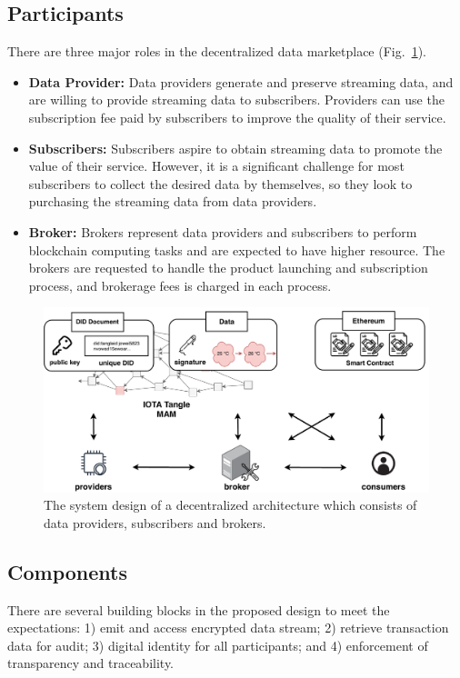 \documentclass[conference]{IEEEtran}
\begin{document}
\subsection{Participants}
There are three major roles in the decentralized data marketplace (Fig.~\ref{fig:system_design}).

\begin{itemize}
\item \textbf{Data Provider: }
Data providers generate and preserve streaming data, and are willing to provide streaming data to subscribers. Providers can use the subscription fee paid by subscribers to improve the quality of their service.
\item \textbf{Subscribers: }
Subscribers aspire to obtain streaming data to promote the value of their service. However, it is a significant challenge for most subscribers to collect the desired data by themselves, so they look to purchasing the streaming data from data providers.
\item \textbf{Broker: }
Brokers represent data providers and subscribers to perform blockchain computing tasks and are expected to have higher resource. The brokers are requested to handle the product launching and subscription process, and brokerage fees is charged in each process.
\end{itemize}

\begin{figure}[!t]
    \centering
    \includegraphics[width=3.in]{system_design}
    \caption{The system design of a decentralized architecture which consists of data providers, subscribers and brokers.}
    \label{fig:system_design}
\end{figure}

\subsection{Components}
There are several building blocks in the proposed design to meet the expectations: 1) emit and access encrypted data stream; 2) retrieve transaction data for audit; 3) digital identity for all participants; and 4) enforcement of transparency and traceability.
\end{document}
